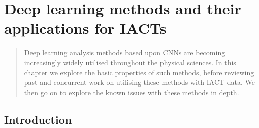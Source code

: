 \chapter{\label{ch:2-CNNs}Deep learning methods and their applications for IACTs}
\minitoc
\begin{abstract}
    Deep learning analysis methods based upon CNNs are becoming increasingly widely utilised throughout the physical sciences. In this chapter we explore the basic properties of such methods, before reviewing past and concurrent work on utilising these methods with IACT data. We then go on to explore the known issues with these methods in depth.
\end{abstract}

\section{Introduction}

